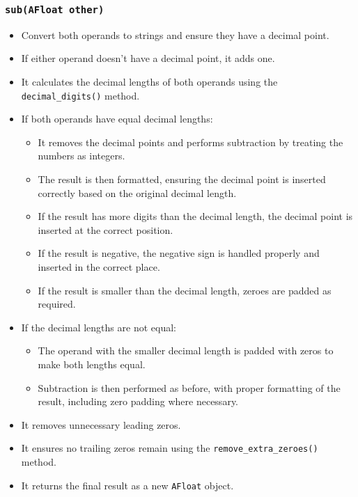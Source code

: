 \documentclass{article}
\begin{document}
\subsubsection*{\texttt{sub(AFloat other)}}
\begin{itemize}
    \item Convert both operands to strings and ensure they have a decimal point.
    \item If either operand doesn't have a decimal point, it adds one.
    \item It calculates the decimal lengths of both operands using the \texttt{decimal\_digits()} method.
    \item If both operands have equal decimal lengths:
        \begin{itemize}
            \item It removes the decimal points and performs subtraction by treating the numbers as integers.
            \item The result is then formatted, ensuring the decimal point is inserted correctly based on the original decimal length.
            \item If the result has more digits than the decimal length, the decimal point is inserted at the correct position.
            \item If the result is negative, the negative sign is handled properly and inserted in the correct place.
            \item If the result is smaller than the decimal length, zeroes are padded as required.
        \end{itemize}
    \item If the decimal lengths are not equal:
        \begin{itemize}
            \item The operand with the smaller decimal length is padded with zeros to make both lengths equal.
            \item Subtraction is then performed as before, with proper formatting of the result, including zero padding where necessary.
        \end{itemize}
    \item It removes unnecessary leading zeros.
    \item It ensures no trailing zeros remain using the \texttt{remove\_extra\_zeroes()} method.
    \item It returns the final result as a new \texttt{AFloat} object.
\end{itemize}
\end{document}
